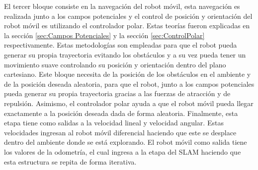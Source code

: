 El tercer bloque consiste en la navegación del robot móvil, esta navegación es realizada 
junto a los campos potenciales y el control de posición y orientación del robot móvil es 
utilizando el controlador polar. Estas teorías fueron explicadas en la sección 
\ref{sec:Campos Potenciales} y la sección \ref{sec:ControlPolar} respectivamente. Estas 
metodologías son empleadas para que el robot pueda generar su propia trayectoria evitando
los obstáculos y a su vez pueda tener un movimiento suave controlando su posición y 
orientación dentro del plano cartesiano. Este bloque necesita de la posición de los obstáculos
en el ambiente y de la posición deseada aleatoria, para que el robot, junto a los campos
potenciales pueda generar su propia trayectoria gracias a las fuerzas de atracción y de 
repulsión. Asimismo, el controlador polar ayuda a que el robot móvil pueda llegar exactamente
a la posición deseada dada de forma aleatoria. Finalmente, esta etapa tiene como salidas a la 
velocidad lineal y velocidad angular. Estas velocidades ingresan al robot móvil diferencial
haciendo que este se desplace dentro del ambiente donde se está explorando. El robot móvil 
como salida tiene los valores de la odometría, el cual ingresa a la etapa del SLAM haciendo que 
esta estructura se repita de forma iterativa.

